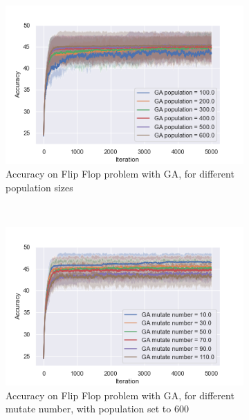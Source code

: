 \documentclass[twocolumn, 10pt]{article}
\begin{document}
				\begin{figure}[h]
					\centering
					\begin{subfigure}[t]{0.32\columnwidth}
						\centering
						\includegraphics[width=\linewidth]{../graphics/flip_flop_GA_Iteration_Error_GA_population.png}
						\caption{Accuracy on Flip Flop problem with GA, for different population sizes}
						\label{ff:ga_pop}
					\end{subfigure}
					~
					\begin{subfigure}[t]{0.32\columnwidth}
						\centering
						\includegraphics[width=\linewidth]{../graphics/flip_flop_GA_Iteration_Error_GA_mutate_number.png}
						\caption{Accuracy on Flip Flop problem with GA, for different mutate number, with population set to 600}
						\label{ff:ga_mutate}
					\end{subfigure}
					~
					\begin{subfigure}[t]{0.32\columnwidth}

\end{subfigure}
\end{figure}
\end{document}
